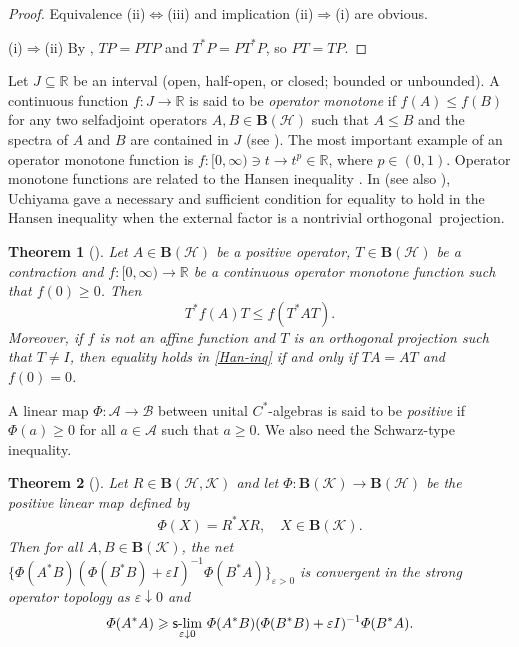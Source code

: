 \documentclass[reqno]{amsproc}
\numberwithin{equation}{section}
\newtheorem{theorem}{Theorem}[section]
\theoremstyle{remark}
\newcommand*{\hh}{\mathcal{H}}
\newcommand*{\kk}{\mathcal{K}}
\theoremstyle{definition}
\newcommand*{\Le}{\leqslant}
\newcommand*{\Ge}{\geqslant}
\newcommand*{\ogr}{\boldsymbol{B}}
\newcommand*{\rbb}{\mathbb{R}}
\def\sslim{\qopname\relax m{{\sf{s}\textrm-}lim}}
\begin{document}
   \begin{proof}
Equivalence (ii)$\Leftrightarrow$(iii) and implication
(ii)$\Rightarrow$(i) are obvious.

(i)$\Rightarrow$(ii) By \cite[Lemma~3.2]{P-S-roots23},
$TP=PTP$ and $T^*P=PT^*P$, so $PT=TP$.
   \end{proof}
Let $J\subseteq \rbb$ be an interval (open, half-open,
or closed; bounded or unbounded). A continuous
function $f \colon J \rightarrow \rbb$ is said to be
\textit{operator monotone} if $f(A)\Le f(B)$ for any
two selfadjoint operators $A,B\in\ogr(\hh)$ such that
$A\Le B$ and the spectra of $A$ and $B$ are contained
in $J$ (see \cite{Sim19}). The most important example
of an operator monotone function is $f\colon
[0,\infty)\ni t\rightarrow t^p\in\rbb$, where $p\in
(0,1)$. Operator monotone functions are related to the
Hansen inequality \cite{Han80}. In
\cite[Lemma~2.2]{uch93} (see also \cite[p.\
6]{P-S21}), Uchiyama gave a necessary and sufficient
condition for equality to hold in the Hansen
inequality when the external factor is a nontrivial
orthogonal~projection.
   \begin{theorem}[\cite{Han80,uch93}]
\label{hans} Let $A\in \ogr(\hh)$ be a
positive operator, $T \in \ogr(\hh)$ be a
contraction and $f\colon
[0,\infty)\rightarrow \rbb$ be a continuous
operator monotone function such that
$f(0)\Ge 0$. Then
   \begin{equation} \label{Han-inq}
T^*f(A)T \Le f(T^*AT).
   \end{equation}
Moreover, if $f$ is not an affine function
and $T$ is an orthogonal projection such
that $T \neq I$, then equality holds in
\eqref{Han-inq} if and only if $TA=AT$ and
$f(0)=0$.
   \end{theorem}
A linear map $\varPhi \colon \mathcal{A} \rightarrow
\mathcal{ B}$ between unital $C^*$-algebras is said to
be {\em positive} if $\varPhi(a) \Ge 0$ for all $a\in
\mathcal{A}$ such that $a \Ge 0$. We also need the
Schwarz-type inequality.
   \begin{theorem}[{\cite[Theorem 2]{L-R74}}] \label{L-R}
Let $R\in \ogr(\hh,\kk)$ and let
$\varPhi\colon\ogr(\kk)\to\ogr(\hh)$ be the positive
linear map defined by
   \begin{align} \label{obmiar}
\varPhi(X)=R^*XR,\quad X\in \ogr(\kk).
   \end{align}
Then for all $A,B\in\ogr(\kk)$, the net
$\{\varPhi(A^*B)(\varPhi(B^*B)+\varepsilon
I)^{-1}\varPhi(B^*A)\}_{\varepsilon>0}$ is
convergent in the strong operator topology
as $\varepsilon \downarrow 0$ and
   \begin{align*}
\varPhi(A^*A)\Ge
\sslim_{\varepsilon\downarrow 0}\,
\varPhi(A^*B)(\varPhi(B^*B)+\varepsilon
I)^{-1}\varPhi(B^*A).
   \end{align*}
   \end{theorem}
\end{document}
